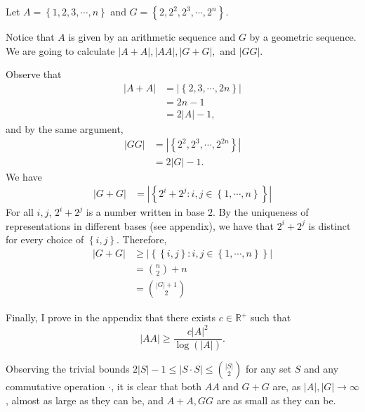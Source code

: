 \documentclass[12pt,reqno]{amsart}
\begin{document}
Let \(A = \left\{ 1, 2, 3, \cdots, n \right\}\) and \(G = \left\{ 2, 2^{2}, 2^{3}, \cdots , 2^{n} \right\}\).

Notice that \(A\) is given by an arithmetic sequence and \(G\) by a geometric sequence.
We are going to calculate \(\left\lvert A+A \right\rvert , \left\lvert AA \right\rvert , \left\lvert G+G \right\rvert ,\) and \(\left\lvert GG \right\rvert \).

Observe that
\begin{align*}
    \left\lvert A + A \right\rvert  & = \left\lvert \left\{2,3, \cdots ,2n \right\}  \right\rvert \\
    & = 2n - 1 \\
    & = 2 \left\lvert A \right\rvert - 1,
\end{align*}
and by the same argument,
\begin{align*}
    \left\lvert GG \right\rvert  & = \left\lvert \left\{2^{2}, 2^{3}, \cdots , 2^{2n} \right\} \right\rvert  \\
    & =2 \left\lvert G \right\rvert -1.
\end{align*}
We have
\begin{align*}
    \left\lvert G + G \right\rvert & = \left\lvert \left\{ 2^{i} + 2^{j} : i,j \in \left\{ 1, \cdots , n \right\} \right\} \right\rvert
\end{align*}
For all \(i,j\), \(2^{i} + 2^{j}\) is a number written in base \(2\). By the uniqueness of representations
in different bases (see appendix), we have that \(2^{i} + 2^{j}\) is distinct for every choice of \(\left\{ i,j \right\} \). Therefore,
\begin{align*}
    \left\lvert G + G \right\rvert & \geq  \left\lvert \left\{ \left\{ i,j \right\} : i,j \in \left\{ 1, \cdots , n \right\}  \right\}  \right\rvert \\
    & = \binom{n}{2} + n \\
    & = \binom{\left\lvert G \right\rvert + 1}{2} 
\end{align*}

Finally, I prove in the appendix that there exists \(c \in \mathbb{R} ^{+}\) such that
\[
    \left\lvert AA \right\rvert \geq  \frac{c \left\lvert A \right\rvert ^{2}}{\log \left( \left\lvert A \right\rvert  \right) }
.\]

Observing the trivial bounds \( 2 \left\lvert S \right\rvert - 1 \leq \left\lvert S \cdot S \right\rvert \leq \binom{\left\lvert S \right\rvert }{2} \) for any set \(S\) and any
commutative operation \(\cdot \), it is clear that both \(AA\) and \(G +G\) are, as \(\left\lvert A \right\rvert, \left\lvert G \right\rvert \to \infty  \), almost as large as they can be,
and \(A + A, GG \) are as small as they can be.
\end{document}
